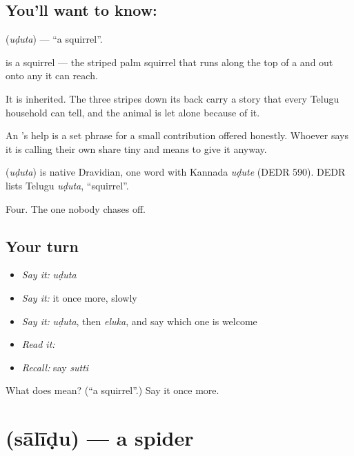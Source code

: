 \subsection*{You'll want to know: }
\textbf{} (\emph{uḍuta}) — \textquotedblleft{}a squirrel\textquotedblright{}.

 is a squirrel — the striped palm squirrel that runs along the top of a  and out onto any  it can reach.

It is inherited. The three stripes down its back carry a story that every Telugu household can tell, and the animal is let alone because of it.

An 's help is a set phrase for a small contribution offered honestly. Whoever says it is calling their own share tiny and means to give it anyway.

\begin{cousinweb}
\textbf{} (\emph{uḍuta}) is native Dravidian, one word with Kannada \emph{uḍute} (DEDR 590). DEDR lists Telugu \emph{uḍuta}, \textquotedblleft{}squirrel\textquotedblright{}.
\end{cousinweb}

\begin{grammarlens}[title={What you've built}]
Four. The one nobody chases off.
\end{grammarlens}

\subsection*{Your turn}
\begin{itemize}
\raggedright
  \item \emph{Say it:} \emph{uḍuta}
  \item \emph{Say it:} it once more, slowly
  \item \emph{Say it:} \emph{uḍuta}, then \emph{eluka}, and say which one is welcome
  \item \emph{Read it:} \textbf{}
  \item \emph{Recall:} say \emph{sutti}
\end{itemize}

\begin{tcolorbox}[breakable,colback=teal!4,colframe=teal!35!black,title={Before you move on}]
What does  mean? (\textquotedblleft{}a squirrel\textquotedblright{}.) Say it once more.
\end{tcolorbox}
\section[\texorpdfstring{\te{సాలీడు} (sālīḍu)}{సాలీడు (sālīḍu)}]{ (sālīḍu) — a spider}

